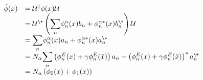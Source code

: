 \begin{equation}
  \label{eq:mode}
  \begin{array}{ll}
  \tilde\phi(x) & ={\cal U}^\dagger\phi(x){\cal U}\\
  &= {\cal U}^\+
  \left(
    {\displaystyle\sum_n} \phi^\alpha_n(x) b_n + \phi_n^{\alpha*}(x) 
b_n^\+\right){\cal U} \\
  &={ \displaystyle\sum_n} \phi^\alpha_n (x)a_n + \phi_n^{\alpha*}(x) a_n^\+ 
\\
    &= N_\alpha {\displaystyle\sum_n}
  \left(\phi^E_n(x)+\gamma{\phi_n^E}(\bar x)\right) a_n
   + \left({\phi^E_n}(x)+\gamma{\phi_n^E}(\bar x)\right)^* a_n^\+  \\
& = N_\alpha \left( \phi_0(x) + \phi_1(x) \right)
  \end{array}
\end{equation}

